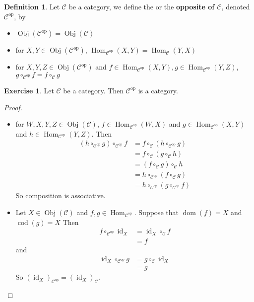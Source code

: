 \documentclass{book}
\theoremstyle{definition}
\newtheorem{defn}[definition]{Definition}
\newtheorem{ex}[definition]{Exercise}
\newcommand{\MC}{\mathcal{C}}
\newcommand{\lex}[1]{\label{ex:#1}}
\newcommand{\ld}[1]{\label{defn:#1}}
\DeclareMathOperator{\id}{id}
\DeclareMathOperator{\dom}{dom}
\DeclareMathOperator{\cod}{cod}
\DeclareMathOperator{\Obj}{Obj}
\DeclareMathOperator{\Hom}{Hom}
\DeclareMathOperator*{\0}{\mbf{0}}
\DeclareMathOperator*{\1}{\mbf{1}}
\newcommand{\op}[1]{\mathcal{#1}^{\text{op}}}
\begin{document}
	\begin{defn}  \ld{12004}
		Let $\MC$ be a category, we define the \text{dual of $\MC$} or the \textbf{opposite of $\MC$}, denoted $\op{C}$, by 
		\begin{itemize}
			\item $\Obj(\op{C}) = \Obj(\MC)$
			\item for $X,Y \in \Obj(\op{C})$, $\Hom_{\op{C}}(X,Y) = \Hom_{\MC}(Y,X)$
			\item for $X, Y, Z \in \Obj(\op{C})$ and $f \in \Hom_{\op{C}}(X, Y), g \in \Hom_{\op{C}}(Y,Z)$, $g \circ_{\op{C}} f = f \circ_{\MC} g$
		\end{itemize}
	\end{defn}

	\begin{ex}  \lex{12005}
		Let $\MC$ be a category. Then $\op{C}$ is a category.
	\end{ex}
	
	\begin{proof}\
		\begin{itemize}
			\item for $W,X,Y,Z \in \Obj(\MC)$, $f \in \Hom_{\op{C}}(W, X)$ and $g \in \Hom_{\op{C}}(X, Y)$ and $h \in \Hom_{\op{C}}(Y, Z)$. Then 
			\begin{align*}
				(h \circ_{\op{C}} g) \circ_{\op{C}} f 
				&= f \circ_{\MC}( h \circ_{\op{C}} g) \\
				&= f \circ_{\MC} (g \circ_{\MC} h) \\
				&= (f \circ_{\MC} g) \circ_{\MC} h \\
				&= h \circ_{\op{C}} (f \circ_{\MC} g) \\
				&= h \circ_{\op{C}} (g \circ_{\op{C}} f)
			\end{align*}
			So composition is associative.
			\item Let $X \in \Obj(\MC)$ and $f,g \in \Hom_{\op{C}}$. Suppose that $\dom(f) = X$ and $\cod(g) = X$ 
			Then 
			\begin{align*}
				f  \circ_{\op{C}} \id_X
				&= \id_X  \circ_{\MC} f \\
				&= f
			\end{align*}
			and 
			\begin{align*}
				\id_X  \circ_{\op{C}} g 
				&= g \circ_{\MC} \id_X \\
				&= g
			\end{align*}
		So $(\id_X)_{\op{C}} =  (\id_X)_{\MC}$.
		\end{itemize}
	\end{proof}
\end{document}
